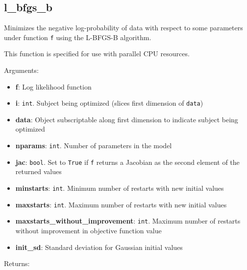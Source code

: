 \subsection{l\_bfgs\_b}\label{l_bfgs_b}

\begin{Shaded}
\begin{Highlighting}[]
\OperatorTok{=}\OperatorTok{=}\OperatorTok{=}\OperatorTok{=}\NormalTok{)}
\end{Highlighting}
\end{Shaded}

Minimizes the negative log-probability of data with respect to some
parameters under function \texttt{f} using the L-BFGS-B algorithm.

This function is specified for use with parallel CPU resources.

Arguments:

\begin{itemize}
\tightlist
\item
  \textbf{f}: Log likelihood function
\item
  \textbf{i}: \texttt{int}. Subject being optimized (slices first
  dimension of \texttt{data})
\item
  \textbf{data}: Object subscriptable along first dimension to indicate
  subject being optimized
\item
  \textbf{nparams}: \texttt{int}. Number of parameters in the model
\item
  \textbf{jac}: \texttt{bool}. Set to \texttt{True} if \texttt{f}
  returns a Jacobian as the second element of the returned values
\item
  \textbf{minstarts}: \texttt{int}. Minimum number of restarts with new
  initial values
\item
  \textbf{maxstarts}: \texttt{int}. Maximum number of restarts with new
  initial values
\item
  \textbf{maxstarts\_without\_improvement}: \texttt{int}. Maximum number
  of restarts without improvement in objective function value
\item
  \textbf{init\_sd}: Standard deviation for Gaussian initial values
\end{itemize}

Returns:


